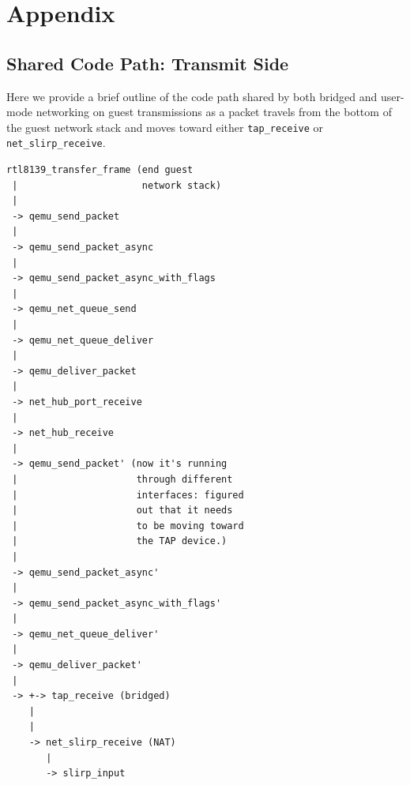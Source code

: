 \documentclass[letterpaper,twocolumn,11pt]{article}
\begin{document}


{\footnotesize 
}

\section*{Appendix}
\label{sec:appendix}
\subsection*{Shared Code Path: Transmit Side}
Here we provide a brief outline of the code path shared by both bridged and user-mode networking on guest transmissions as a packet travels from the bottom of the guest network stack and moves toward either \texttt{tap\_receive} or \texttt{net\_slirp\_receive}. 

\begin{verbatim}
rtl8139_transfer_frame (end guest 
 |                      network stack)
 |
 -> qemu_send_packet
 |
 -> qemu_send_packet_async
 |
 -> qemu_send_packet_async_with_flags
 |
 -> qemu_net_queue_send
 |
 -> qemu_net_queue_deliver
 |
 -> qemu_deliver_packet
 |
 -> net_hub_port_receive
 |
 -> net_hub_receive
 |
 -> qemu_send_packet' (now it's running 
 |                     through different 
 |                     interfaces: figured 
 |                     out that it needs  
 |                     to be moving toward 
 |                     the TAP device.)
 |
 -> qemu_send_packet_async'
 |
 -> qemu_send_packet_async_with_flags'
 |
 -> qemu_net_queue_deliver'
 |
 -> qemu_deliver_packet'
 |
 -> +-> tap_receive (bridged)
    |
    |
    -> net_slirp_receive (NAT)
       |
       -> slirp_input 
\end{verbatim}
\end{document}

